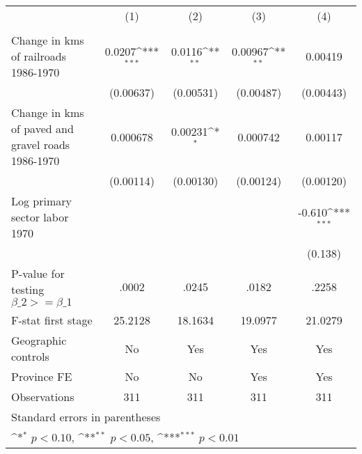{
\def\sym#1{\ifmmode^{#1}\else\(^{#1}\)\fi}
\begin{tabular}{l*{4}{c}}
\hline\hline
                &\multicolumn{1}{c}{(1)}&\multicolumn{1}{c}{(2)}&\multicolumn{1}{c}{(3)}&\multicolumn{1}{c}{(4)}\\
                &\multicolumn{1}{c}{}&\multicolumn{1}{c}{}&\multicolumn{1}{c}{}&\multicolumn{1}{c}{}\\
\hline
Change in kms of railroads 1986-1970&   0.0207\sym{***}&   0.0116\sym{**} &  0.00967\sym{**} &  0.00419         \\
                &(0.00637)         &(0.00531)         &(0.00487)         &(0.00443)         \\
[1em]
Change in kms of paved and gravel roads 1986-1970& 0.000678         &  0.00231\sym{*}  & 0.000742         &  0.00117         \\
                &(0.00114)         &(0.00130)         &(0.00124)         &(0.00120)         \\
[1em]
Log primary sector labor 1970&                  &                  &                  &   -0.610\sym{***}\\
                &                  &                  &                  &  (0.138)         \\
\hline
P-value for testing $\beta\_{2} >= \beta\_{1}$&    .0002         &    .0245         &    .0182         &    .2258         \\
F-stat first stage&  25.2128         &  18.1634         &  19.0977         &  21.0279         \\
Geographic controls&       No         &      Yes         &      Yes         &      Yes         \\
Province FE     &       No         &       No         &      Yes         &      Yes         \\
Observations    &      311         &      311         &      311         &      311         \\
\hline\hline
\multicolumn{5}{l}{\footnotesize Standard errors in parentheses}\\
\multicolumn{5}{l}{\footnotesize \sym{*} \(p<0.10\), \sym{**} \(p<0.05\), \sym{***} \(p<0.01\)}\\
\end{tabular}
}
